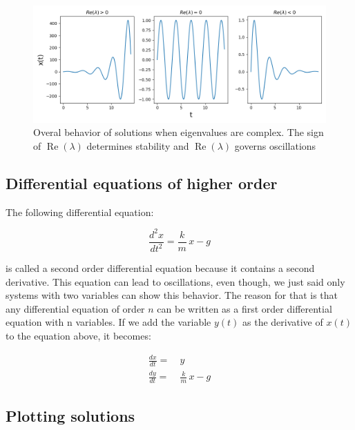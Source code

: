 \documentclass[12pt]{article}
\begin{document}
\begin{figure}
	\begin{center}
		\includegraphics[width=\textwidth]{complex_eigen}
	\end{center}
	\caption{Overal behavior of solutions when eigenvalues are complex. The sign of $\operatorname{Re}(\lambda)$ determines stability and $\operatorname{Re}(\lambda)$ governs oscillations}
	\label{fig:cmplxeigen}
\end{figure}


\FloatBarrier

\subsection{Differential equations of higher order}

The following differential equation:

\begin{equation}
	 \frac{d^2x}{dt^2} = \frac{k}{m} \, x - g \nonumber
\end{equation}

is called a second order differential equation because it contains a second derivative. This equation can lead to oscillations, even though, we just said only systems with two variables can show this behavior. The reason for that is that any  differential equation of order $n$ can be written as a first order differential equation with n variables. If we add the variable $y(t)$ as the derivative of $x(t)$ to the equation above, it becomes:

\begin{align}
	\frac{dx}{dt} =& \: y \nonumber \\
	\frac{dy}{dt} =& \: \frac{k}{m} \, x - g \nonumber
\end{align}


\subsection{Plotting solutions}
\end{document}
